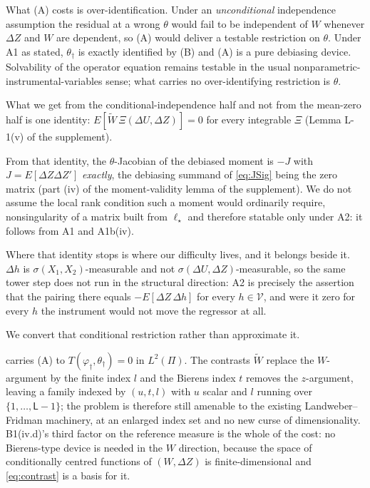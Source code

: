 \documentclass[
  12pt]{article}
\newcommand{\1}[1]{\mathds{1}\left[#1\right]}
\theoremstyle{plain}
\theoremstyle{definition}
\theoremstyle{definition}
\theoremstyle{remark}
\newcommand{\vdagger}{\varphi_{\dagger}}
\begin{document}
What (A) costs is over-identification. Under an \emph{unconditional}
independence assumption the residual at a wrong \(\theta\) would fail to
be independent of \(W\) whenever \(\Delta Z\) and \(W\) are dependent,
so (A) would deliver a testable restriction on \(\theta\). Under A1 as
stated, \(\theta_\dagger\) is exactly identified by (B) and (A) is a
pure debiasing device. Solvability of the operator equation remains
testable in the usual nonparametric-instrumental-variables sense; what
carries no over-identifying restriction is \(\theta\).

What we get from the conditional-independence half and not from the
mean-zero half is one identity:
\(E[\widetilde W\,\Xi(\Delta U,\Delta Z)]=0\) for every integrable
\(\Xi\) (Lemma L-1(v) of the supplement).

From that identity, the \(\theta\)-Jacobian of the debiased moment is
\(-J\) with \(J=E[\Delta Z\Delta Z']\) \emph{exactly}, the debiasing
summand of \eqref{eq:JSig} being the zero matrix (part (iv) of the
moment-validity lemma of the supplement). We do not assume the local
rank condition such a moment would ordinarily require, nonsingularity of
a matrix built from \(\ell_\star\) and therefore statable only under A2:
it follows from A1 and A1b(iv).

Where that identity stops is where our difficulty lives, and it belongs
beside it. \(\Delta h\) is \(\sigma(X_1,X_2)\)-measurable and not
\(\sigma(\Delta U,\Delta Z)\)-measurable, so the same tower step does
not run in the structural direction: A2 is precisely the assertion that
the pairing there equals \(-E[\Delta Z\,\Delta h]\) for every
\(h\in\mathcal V\), and were it zero for every \(h\) the instrument
would not move the regressor at all.

We convert that conditional restriction rather than approximate it.

 carries (A) to \(T(\vdagger,\theta_\dagger)=0\) in
\(L^{2}(\Pi)\). The contrasts \(\widetilde W\) replace the
\(W\)-argument by the finite index \(l\) and the Bierens index \(t\)
removes the \(z\)-argument, leaving a family indexed by \((u,t,l)\) with
\(u\) scalar and \(l\) running over \(\{1,\dots,\mathsf L-1\}\); the
problem is therefore still amenable to the existing Landweber--Fridman
machinery, at an enlarged index set and no new curse of dimensionality.
B1(iv.d)'s third factor on the reference measure is the whole of the
cost: no Bierens-type device is needed in the \(W\) direction, because
the space of conditionally centred functions of \((W,\Delta Z)\) is
finite-dimensional and \eqref{eq:contrast} is a basis for it.
\end{document}
